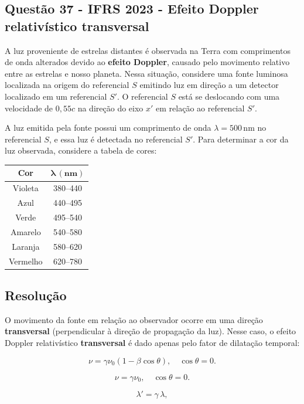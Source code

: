 \begin{flushleft}
\begin{flushleft}
\subsection{Quest\~ao 37 - IFRS 2023 - Efeito Doppler relativ\'istico transversal}
A luz proveniente de estrelas distantes \'e observada na Terra com comprimentos de onda alterados devido ao \textbf{efeito Doppler}, causado 
pelo movimento relativo entre as estrelas e nosso planeta. Nessa situa\c{c}\~ao, considere uma fonte luminosa localizada na origem do referencial $S$ 
emitindo luz em dire\c{c}\~ao a um detector localizado em um referencial $S'$. O referencial $S$ est\'a se deslocando com uma velocidade de $0,55c$ 
na dire\c{c}\~ao do eixo $x'$ em rela\c{c}\~ao ao referencial $S'$. 

A luz emitida pela fonte possui um comprimento de onda $\lambda = 500\,\text{nm}$ no referencial $S$, e essa luz \'e detectada no referencial $S'$. 
Para determinar a cor da luz observada, considere a tabela de cores:

\begin{center}
\begin{tabular}{|c|c|}
\hline
\textbf{Cor} & $\boldsymbol{\lambda \, (\text{nm})}$ \\
\hline
Violeta & 380--440 \\
Azul    & 440--495 \\
Verde   & 495--540 \\
Amarelo & 540--580 \\
Laranja & 580--620 \\
Vermelho& 620--780 \\
\hline
\end{tabular}
\end{center}

\subsection*{Resolu\c{c}\~ao}

O movimento da fonte em rela\c{c}\~ao ao observador ocorre em uma dire\c{c}\~ao \textbf{transversal} (perpendicular à dire\c{c}\~ao de 
propaga\c{c}\~ao da luz). Nesse caso, o efeito Doppler relativ\'istico \textbf{transversal} \'e dado apenas pelo fator de dilata\c{c}\~ao temporal:

\[
\nu = \gamma\nu_{0}\left(1-\beta\cos\theta\right), \quad \cos\theta = 0.
\]

\[
\nu = \gamma\nu_{0}, \quad \cos\theta = 0.
\]

\[
\lambda' = \gamma \, \lambda,
\]


\end{flushleft}
\end{flushleft}
